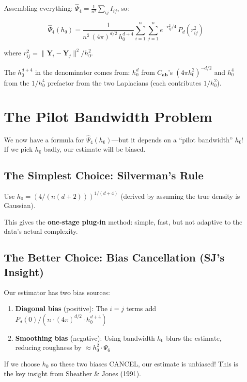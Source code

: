 \documentclass[12pt]{article}
\newcommand{\note}[1]{\begin{tcolorbox}[colback=yellow!5,colframe=yellow!60!black,breakable]\small #1\end{tcolorbox}}
\newcommand{\whythis}[1]{\begin{tcolorbox}[colback=orange!5,colframe=orange!50!black,title=Why?,breakable]\small #1\end{tcolorbox}}
\begin{document}
Assembling everything: $\hat\Psi_4 = \frac{1}{n^2}\sum_{ij} I_{ij}$, so:

$$\hat\Psi_4(h_0) = \frac{1}{n^2\,(4\pi)^{d/2}\,h_0^{d+4}} \sum_{i=1}^n\sum_{j=1}^n e^{-r_{ij}^2/4}\,P_d(r_{ij}^2)$$

where $r_{ij}^2 = \|\mathbf{Y}_i - \mathbf{Y}_j\|^2/h_0^2$.

\note{The $h_0^{d+4}$ in the denominator comes from: $h_0^d$ from $C_{\mathbf{ab}}$'s $(4\pi h_0^2)^{-d/2}$ and $h_0^4$ from the $1/h_0^4$ prefactor from the two Laplacians (each contributes $1/h_0^2$).}

\section{The Pilot Bandwidth Problem}

We now have a formula for $\hat\Psi_4(h_0)$---but it depends on a ``pilot bandwidth'' $h_0$! If we pick $h_0$ badly, our estimate will be biased.

\subsection{The Simplest Choice: Silverman's Rule}

Use $h_0 = (4/(n(d+2)))^{1/(d+4)}$ (derived by assuming the true density is Gaussian).

This gives the \textbf{one-stage plug-in} method: simple, fast, but not adaptive to the data's actual complexity.

\subsection{The Better Choice: Bias Cancellation (SJ's Insight)}

Our estimator has two bias sources:
\begin{enumerate}
\item \textbf{Diagonal bias} (positive): The $i=j$ terms add $P_d(0)/(n\cdot(4\pi)^{d/2}\cdot h_0^{d+4})$
\item \textbf{Smoothing bias} (negative): Using bandwidth $h_0$ blurs the estimate, reducing roughness by $\approx h_0^2\cdot\Psi_6$
\end{enumerate}

\whythis{If we choose $h_0$ so these two biases CANCEL, our estimate is unbiased! This is the key insight from Sheather \& Jones (1991).}
\end{document}
